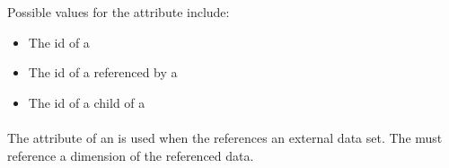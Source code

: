 Possible values for the  attribute include:
\begin{itemize}
        \item The id of a \RepeatedTask
        \item The id of a \Task referenced by a \RepeatedTask
        \item The id of a \SubTask child of a \RepeatedTask
\end{itemize}

\paragraph*{}
The  attribute of an \AppliedDimension is used when the \Variable references an external data set.  The  must reference a dimension of the referenced data.


